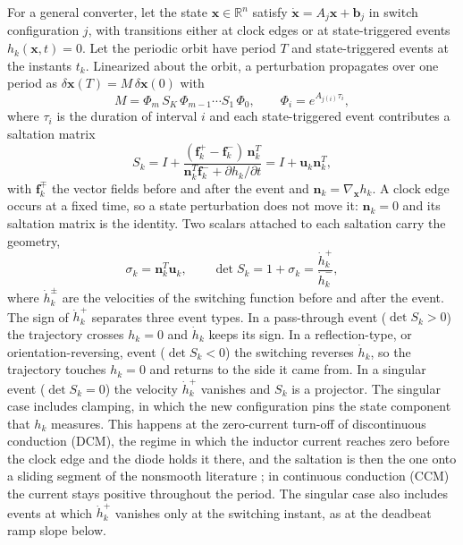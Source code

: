 \documentclass[journal]{IEEEtran}
\begin{document}
For a general converter, let the state $\bm{x}\in\mathbb{R}^n$ satisfy
$\dot{\bm{x}}=A_j\bm{x}+\bm{b}_j$ in switch configuration $j$, with
transitions either at clock edges or at state-triggered events
$h_k(\bm{x},t)=0$. Let the periodic orbit have period $T$ and state-triggered
events at the instants $t_k$. Linearized about the orbit, a perturbation
propagates over one period as $\delta\bm{x}(T)=M\,\delta\bm{x}(0)$ with
\begin{equation}
M=\Phi_{m}\,S_{K}\,\Phi_{m-1}\cdots S_{1}\,\Phi_{0},\qquad
\Phi_i=e^{A_{j(i)}\tau_i},
\label{eq:monodromy}
\end{equation}
where $\tau_i$ is the duration of interval $i$ and each state-triggered event
contributes a saltation matrix \cite{muller1995,leine2004,giaouris2008stability}
\begin{equation}
S_k=I+\frac{(\bm{f}_k^{+}-\bm{f}_k^{-})\,\bm{n}_k^{T}}{\bm{n}_k^{T}\bm{f}_k^{-}+\partial h_k/\partial t}
   =I+\bm{u}_k \bm{n}_k^{T},
\label{eq:saltation}
\end{equation}
with $\bm{f}_k^{\mp}$ the vector fields before and after the event and
$\bm{n}_k=\nabla_{\bm{x}}h_k$. A clock edge occurs at a fixed time, so a state
perturbation does not move it: $\bm{n}_k=0$ and its saltation matrix is the
identity. Two scalars attached to each saltation carry the geometry,
\begin{equation}
\sigma_k=\bm{n}_k^{T}\bm{u}_k,\qquad
\det S_k=1+\sigma_k=\frac{\dot h_k^{+}}{\dot h_k^{-}},
\label{eq:dets}
\end{equation}
where $\dot h_k^{\pm}$ are the velocities of the switching function before
and after the event. The sign of $\dot h_k^{+}$ separates three event types.
In a pass-through event ($\det S_k>0$) the trajectory crosses $h_k=0$ and
$\dot h_k$ keeps its sign. In a reflection-type, or orientation-reversing,
event ($\det S_k<0$) the switching reverses $\dot h_k$, so the trajectory
touches $h_k=0$ and returns to the side it came from. In a singular event
($\det S_k=0$) the velocity $\dot h_k^{+}$ vanishes and $S_k$ is a projector.
The singular case includes clamping, in which the new configuration pins the
state component that $h_k$ measures. This happens at the zero-current
turn-off of discontinuous conduction (DCM), the regime in which the inductor
current reaches zero before the clock edge and the diode holds it there, and
the saltation is then the one onto a sliding segment of the nonsmooth
literature \cite{leine2004,dibernardo2008}; in continuous conduction (CCM)
the current stays positive throughout the period. The singular case also
includes events at which $\dot h_k^{+}$ vanishes only at the switching
instant, as at the deadbeat ramp slope below.
\end{document}
